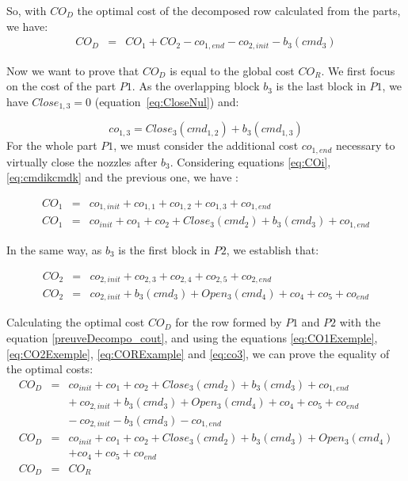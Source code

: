So, with $CO_D$ the optimal cost of the decomposed row calculated from the parts, we have:
\begin{eqnarray}
CO_D &=& CO_1 + CO_2 - co_{1,end} - co_{2,init} - b_{3}(cmd_3)  \label{preuveDecompo_cout}
\end{eqnarray}

Now we want to prove that $CO_D$ is equal to the global cost $CO_R$. We first focus on the cost of the part $P1$. As the overlapping block $b_3$ is the last block in $P1$, we have $Close_{1,3}=0$  (equation~\ref{eq:CloseNul}) and:

$$co_{1,3} = Close_3(cmd_{1,2}) + b_3(cmd_{1,3})$$
For the whole part $P1$, we must consider the additional cost $co_{1,end}$ necessary to virtually close the nozzles after $b_3$. Considering equations \ref{eq:COi}, \ref{eq:cmdikcmdk} and the previous one, we have :

\begin{eqnarray}
CO_1 & = & co_{1,init}+co_{1,1}+co_{1,2}+ co_{1,3}+ co_{1,end}  \nonumber\\
CO_1 & = & co_{init}+co_{1}+co_{2}+Close_3(cmd_{2}) + b_3(cmd_{3})+ co_{1,end} \label{eq:CO1Exemple}
\end{eqnarray} 

In the same way, as $b_3$ is the first block in $P2$, we establish that:

\begin{eqnarray}
CO_2 & = & co_{2,init}+co_{2,3}+co_{2,4}+co_{2,5}+co_{2,end}  \nonumber\\
CO_2 & = & co_{2,init}+b_3(cmd_{3}) + Open_3(cmd_{4})+co_{4}+co_{5}+co_{end}  \label{eq:CO2Exemple}
\end{eqnarray}


Calculating the optimal cost $CO_D$ for the row formed by $P1$ and $P2$ with the equation \ref{preuveDecompo_cout}, and using the equations \ref{eq:CO1Exemple}, \ref{eq:CO2Exemple}, \ref{eq:CORExample} and \ref{eq:co3}, we can prove the equality of the optimal costs: 
\begin{eqnarray*}
CO_D &=&co_{init}+co_{1}+co_{2}+Close_3(cmd_{2}) + b_3(cmd_{3})+ co_{1,end} \nonumber\\
&& +\ co_{2,init}+b_3(cmd_{3}) + Open_3(cmd_{4})+co_{4}+co_{5}+co_{end} \nonumber\\
&& -\ co_{2,init} - b_{3}(cmd_{3}) - co_{1,end} \nonumber\\
CO_D &=&co_{init}+co_{1}+co_{2}+Close_3(cmd_{2}) + b_3(cmd_{3}) + Open_3(cmd_{4})\nonumber\\
&&  +co_{4}+co_{5}+co_{end}  \nonumber\\
CO_D &=&CO_R 
\end{eqnarray*}



